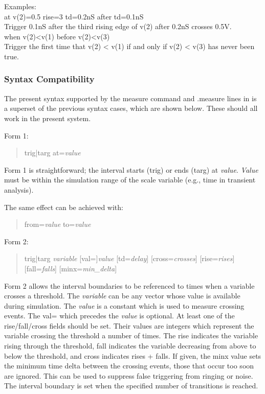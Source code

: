 Examples:\\
{\vt at v(2)=0.5 rise=3 td=0.2nS after td=0.1nS}\\
\hspace*{1em}Trigger 0.1nS after the third rising edge of v(2) after
0.2nS crosses 0.5V.\\
{\vt when v(2)<v(1) before v(2)<v(3)}\\
\hspace*{1em}Trigger the first time that {\vt v(2) < v(1)} if and only
if {\vt v(2) < v(3)} has never been true.

\subsubsection{Syntax Compatibility}

The present syntax supported by the {\cb measure} command and {\vt
.measure} lines in {\WRspice} is a superset of the previous syntax
cases, which are shown below.  These should all work in the present
system.

Form 1:
\begin{quote}\vt
    trig|targ at={\it value}
\end{quote}

Form 1 is straightforward; the interval starts ({\vt trig}) or ends
({\vt targ}) at {\it value}.  {\it Value} must be within the
simulation range of the scale variable (e.g., time in transient
analysis).

The same effect can be achieved with:
\begin{quote}\vt
    from={\it value} to={\it value}
\end{quote}

Form 2:
\begin{quote}\vt
    trig|targ {\it variable} [val=]{\it value}
        [td={\it delay}] [cross={\it crosses}]
        [rise={\it rises}] [fall={\it falls}] [minx={\it min\_delta}]
\end{quote}

Form 2 allows the interval boundaries to be referenced to times when a
variable crosses a threshold.  The {\it variable} can be any vector
whose value is available during simulation.  The {\it value} is a
constant which is used to measure crossing events.  The {\vt val=}
which precedes the {\it value} is optional.  At least one of the {\vt
rise/fall/cross} fields should be set.  Their values are integers
which represent the variable crossing the threshold a number of times. 
The {\vt rise} indicates the variable rising through the threshold,
{\vt fall} indicates the variable decreasing from above to below the
threshold, and {\vt cross} indicates {\vt rises + falls}.  If given,
the {\vt minx} value sets the minimum time delta between the crossing
events, those that occur too soon are ignored.  This can be used to
suppress false triggering from ringing or noise.  The interval
boundary is set when the specified number of transitions is reached.

